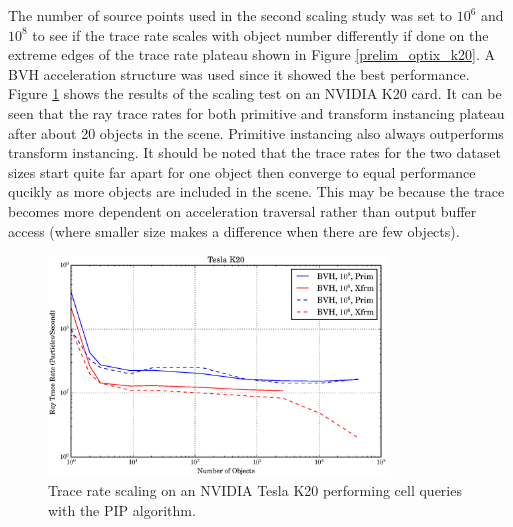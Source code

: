 The number of source points used in the second scaling study was set to $10^6$ and $10^8$ to see if the trace rate scales with object number differently if done on the extreme edges of the trace rate plateau shown in Figure \ref{prelim_optix_k20}.  A BVH acceleration structure was used since it showed the best performance.  Figure \ref{prelim_optix_scaling} shows the results of the scaling test on an NVIDIA K20 card.  It can be seen that the ray trace rates for both primitive and transform instancing plateau after about 20 objects in the scene.  Primitive instancing also always outperforms transform instancing.  It should be noted that the trace rates for the two dataset sizes start quite far apart for one object then converge to equal performance qucikly as more objects are included in the scene.  This may be because the trace becomes more dependent on acceleration traversal rather than output buffer access (where smaller size makes a difference when there are few objects). 
 
\begin{figure}[h!] 
  \centering
    \includegraphics[width=0.8\textwidth]{graphics/prelim_optix_scaling.eps}
     \caption{Trace rate scaling on an NVIDIA Tesla K20 performing cell queries with the PIP algorithm. \label{prelim_optix_scaling} }
\end{figure}

